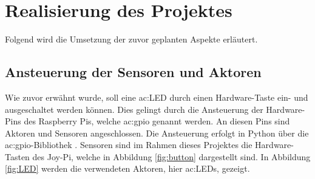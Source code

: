 \chapter{Realisierung des Projektes}
Folgend wird die Umsetzung der zuvor geplanten Aspekte erläutert. 

\section{Ansteuerung der Sensoren und Aktoren}
Wie zuvor erwähnt wurde, soll eine \gls{ac:LED} durch einen Hardware-Taste ein- und ausgeschaltet werden können. Dies gelingt durch die Ansteuerung der Hardware-Pins des Raspberry Pis, welche \gls{ac:gpio} genannt werden. An diesen Pins sind Aktoren und Sensoren angeschlossen. Die Ansteuerung erfolgt in Python über die \gls{ac:gpio}-Bibliothek \cite{latex:gpio}. Sensoren sind im Rahmen dieses Projektes die Hardware-Tasten des Joy-Pi, welche in Abbildung \ref{fig:button} dargestellt sind. In Abbildung \ref{fig:LED} werden die verwendeten Aktoren, hier \gls{ac:LED}s, gezeigt. 

